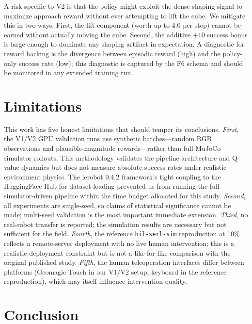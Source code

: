 \documentclass[12pt,a4paper]{article}
\begin{document}
A risk specific to V2 is that the policy might exploit the dense shaping signal to maximize approach reward without ever attempting to lift the cube. We mitigate this in two ways. First, the lift component (worth up to 4.0 per step) cannot be earned without actually moving the cube. Second, the additive $+10$ success bonus is large enough to dominate any shaping artifact in expectation. A diagnostic for reward hacking is the divergence between episodic reward (high) and the policy-only success rate (low); this diagnostic is captured by the F6 schema and should be monitored in any extended training run.

\section{Limitations} \label{sec:limitations}

This work has five honest limitations that should temper its conclusions. \emph{First}, the V1/V2 GPU validation runs use synthetic batches---random RGB observations and plausible-magnitude rewards---rather than full MuJoCo simulator rollouts. This methodology validates the pipeline architecture and Q-value dynamics but does not measure absolute success rates under realistic environment physics. The lerobot 0.4.2 framework's tight coupling to the HuggingFace Hub for dataset loading prevented us from running the full simulator-driven pipeline within the time budget allocated for this study. \emph{Second}, all experiments are single-seed, so claims of statistical significance cannot be made; multi-seed validation is the most important immediate extension. \emph{Third}, no real-robot transfer is reported; the simulation results are necessary but not sufficient for the field. \emph{Fourth}, the reference \texttt{hil-serl-sim} reproduction at 10\% reflects a remote-server deployment with no live human intervention; this is a realistic deployment constraint but is not a like-for-like comparison with the original published study. \emph{Fifth}, the human teleoperation interfaces differ between platforms (Geomagic Touch in our V1/V2 setup, keyboard in the reference reproduction), which may itself influence intervention quality.

\section{Conclusion} \label{sec:conclusion}
\end{document}

